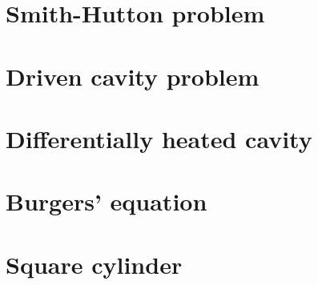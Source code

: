 \chapter{Smith-Hutton problem}


\chapter{Driven cavity problem}


\chapter{Differentially heated cavity}


\chapter{Burgers' equation}


\chapter{Square cylinder}


